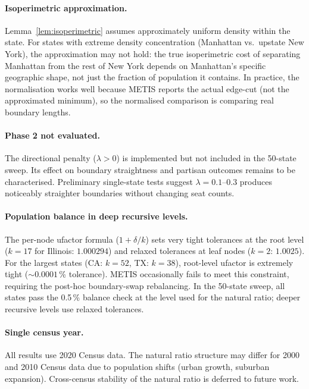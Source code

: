 \paragraph{Isoperimetric approximation.}
Lemma~\ref{lem:isoperimetric} assumes approximately uniform density within
the state.
For states with extreme density concentration (Manhattan vs.\ upstate New York),
the approximation may not hold: the true isoperimetric cost of separating
Manhattan from the rest of New York depends on Manhattan's specific geographic
shape, not just the fraction of population it contains.
In practice, the normalisation works well because METIS reports the actual
edge-cut (not the approximated minimum), so the normalised comparison is
comparing real boundary lengths.

\paragraph{Phase 2 not evaluated.}
The directional penalty ($\lambda > 0$) is implemented but not included in
the 50-state sweep.
Its effect on boundary straightness and partisan outcomes remains to be
characterised.
Preliminary single-state tests suggest $\lambda = 0.1$--$0.3$ produces
noticeably straighter boundaries without changing seat counts.

\paragraph{Population balance in deep recursive levels.}
The per-node ufactor formula ($1 + \delta/k$) sets very tight tolerances
at the root level ($k=17$ for Illinois: $1.000294$) and relaxed tolerances
at leaf nodes ($k=2$: $1.0025$).
For the largest states (CA: $k=52$, TX: $k=38$), root-level ufactor is
extremely tight ($\sim 0.0001$\,\% tolerance).
METIS occasionally fails to meet this constraint, requiring the post-hoc
boundary-swap rebalancing.
In the 50-state sweep, all states pass the 0.5\,\% balance check at the
level used for the natural ratio; deeper recursive levels use relaxed
tolerances.

\paragraph{Single census year.}
All results use 2020 Census data.
The natural ratio structure may differ for 2000 and 2010 Census data
due to population shifts (urban growth, suburban expansion).
Cross-census stability of the natural ratio is deferred to future work.
